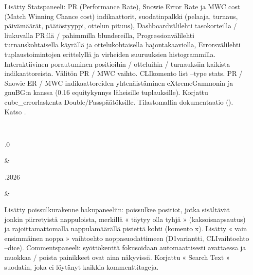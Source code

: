 \documentclass[letterpaper,10pt,finnish]{sphinxmanual}
\begin{document}
\begin{savenotes}
\begin{longtable}{}
\begin{varwidth}[t]{}
Lisätty Stats\sphinxhyphen{}paneeli: PR (Performance Rate)\sphinxhyphen{}, Snowie Error Rate\sphinxhyphen{} ja MWC cost (Match Winning Chance cost) \sphinxhyphen{}indikaattorit, suodatinpalkki (pelaaja, turnaus, päivämäärät, päätöstyyppi, ottelun pituus), Dashboard\sphinxhyphen{}välilehti tasokorteilla / liukuvalla PR:llä / pahimmilla blundereilla, Progression\sphinxhyphen{}välilehti turnauskohtaisella käyrällä ja ottelukohtaisella hajontakaaviolla, Errors\sphinxhyphen{}välilehti tuplaustoimintojen erittelyllä ja virheiden suuruuksien histogrammilla. Interaktiivinen porautuminen positioihin / otteluihin / turnauksiin kaikista indikaattoreista. Välitön PR / MWC \sphinxhyphen{}vaihto. CLI\sphinxhyphen{}komento list –type stats. PR / Snowie ER / MWC \sphinxhyphen{}indikaattoreiden yhtenäistäminen eXtremeGammonin ja gnuBG:n kanssa (0.16 equity\sphinxhyphen{}kynnys läheisille tuplauksille). Korjattu cube\_error\sphinxhyphen{}laskenta Double/Pass\sphinxhyphen{}päätöksille. Tilastomallin dokumentaatio ({\hyperref[\detokenize{stats_parity:stats-parity}]{}}). Katso {\hyperref[\detokenize{manuel:stats}]{}}.
\sphinxbeforeendvarwidth
\end{varwidth}%
\\
\sphinxhline\begin{varwidth}[t]{}
.0
\sphinxbeforeendvarwidth
\end{varwidth}%
&\begin{varwidth}[t]{}
.2026
\sphinxbeforeendvarwidth
\end{varwidth}%
&\begin{varwidth}[t]{}
\sphinxAtStartPar
Lisätty \sphinxhyphen{}poissulkurakenne hakupaneeliin: poissulkee positiot, jotka sisältävät jonkin piirretyistä nappuloista, merkillä « täytyy olla tyhjä » (kaksoisnapsautus) ja rajoittamattomalla nappulamäärällä pistettä kohti (komento x). Lisätty « vain ensimmäinen noppa » \sphinxhyphen{}vaihtoehto noppasuodattimeen (D1\sphinxhyphen{}variantti, CLI\sphinxhyphen{}vaihtoehto –dice). Comments\sphinxhyphen{}paneeli: syöttökenttä fokusoidaan automaattisesti avattaessa ja muokkaa / poista \sphinxhyphen{}painikkeet ovat aina näkyvissä. Korjattu « Search Text » \sphinxhyphen{}suodatin, joka ei löytänyt kaikkia kommenttitageja.
\sphinxbeforeendvarwidth

\end{varwidth}
\end{longtable}
\end{savenotes}
\end{document}
